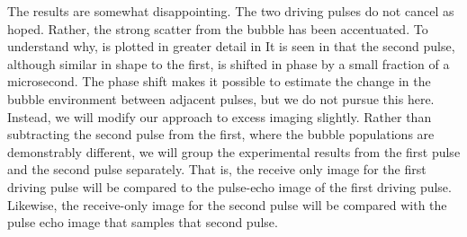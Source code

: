 The results are somewhat disappointing.
The two driving pulses do not cancel as hoped.
Rather, the strong scatter from the bubble has been accentuated.
To understand why,  is plotted in greater detail in 
It is seen in  that the second pulse,
although similar in shape to the first,
is shifted in phase by a small fraction of a microsecond.
%
The phase shift makes it possible to estimate
the change in the bubble environment between adjacent pulses,
but we do not pursue this here.
Instead, 
we will modify our approach to excess imaging slightly.
Rather than subtracting the second pulse from the first,
where the bubble populations are demonstrably different,
we will group the experimental results 
from the first pulse and the second pulse separately.
That is, 
the receive only image for the first driving pulse will
be compared to the pulse-echo image of the first driving pulse.
Likewise,
the receive-only image for the second pulse will be compared with
the pulse echo image that samples that second pulse.




